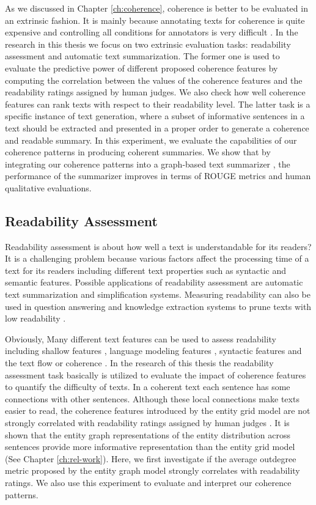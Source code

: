 As we discussed in Chapter \ref{ch:coherence}, coherence is better to be evaluated in an extrinsic fashion. 
It is mainly because annotating texts for coherence is quite expensive and controlling all conditions for annotators is very difficult \cite{karamanis04a}. 
In the research in this thesis we focus on two extrinsic evaluation tasks: readability assessment and automatic text summarization. 
The former one is used to evaluate the predictive power of different proposed coherence features by computing the correlation between the values of the coherence features and the readability ratings assigned by human judges. 
We also check how well coherence features can rank texts with respect to their readability level. 
The latter task is a specific instance of text generation, where a subset of informative sentences in a text should be extracted and presented in a proper order to generate a coherence and readable summary. 
In this experiment, we evaluate the capabilities of our coherence patterns in producing coherent summaries. 
We show that by integrating our coherence patterns into a graph-based text summarizer \cite{parveen15a}, the performance of the summarizer improves in terms of ROUGE metrics and human qualitative evaluations.

\subsection{Readability Assessment}
\label{sec:readability_assessment}

Readability assessment is about how well a text is understandable for its readers? 
It is a challenging problem because various factors affect the processing time of a text for its readers including different text properties such as syntactic and semantic features.
Possible applications of readability assessment are automatic text summarization and simplification systems. 
Measuring readability can also be used in question answering and knowledge extraction systems to prune texts with low readability \cite{kate10}. 

Obviously, Many different text features can be used to assess readability including shallow features \cite{flesch48,kincaid75}, language modeling features \cite{siluo01,collins-thompson04}, syntactic features \cite{schwarm05} and the text flow or coherence \cite{barzilay08,pitler08}.
In the research of this thesis the readability assessment task basically is utilized to evaluate the impact of coherence features to quantify the difficulty of texts.  
In a coherent text each sentence has some connections with other sentences. 
Although these local connections make texts easier to read, the coherence features introduced by the entity grid model \cite{barzilay08} are not strongly correlated with readability ratings assigned by human judges \cite{pitler08}.  
It is shown that the entity graph representations of the entity distribution across sentences provide more informative representation than the entity grid model (See Chapter \ref{ch:rel-work}).  
Here, we first investigate if the average outdegree metric proposed by the entity graph model strongly correlates with readability ratings. 
We also use this experiment to evaluate and interpret our coherence patterns. 

